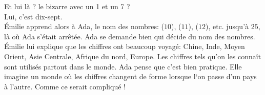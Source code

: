 \mdash Et lui là ? le bizarre avec un 1 et un 7 ?\\
\mdash Lui, c’est dix-sept. \guillemotright\\ 
Émilie apprend alors à Ada, le nom des nombres:  ($10$),  ($11$),  ($12$), etc. jusqu’à $25$, là où Ada s’était arrêtée. 
Ada se demande bien qui décide du nom des nombres. Émilie lui explique que les chiffres ont beaucoup voyagé: Chine, Inde, Moyen Orient, Asie Centrale, Afrique du nord, Europe. 
Les chiffres tels qu’on les connaît sont utilisés partout dans le monde.
Ada pense que c'est bien pratique. Elle imagine un monde où les chiffres changent de forme lorsque l‘on passe d'un pays à l'autre. Comme ce serait compliqué !


%    
